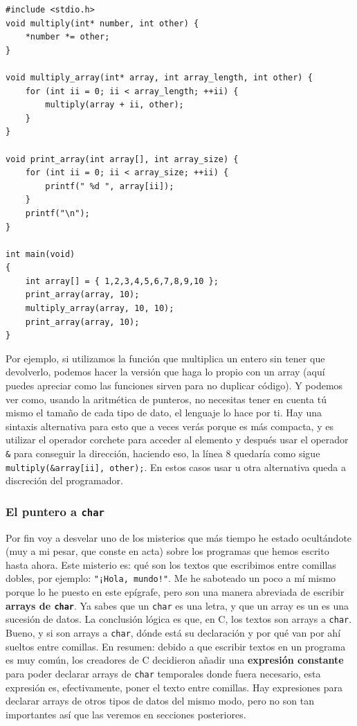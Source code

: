 \documentclass[a4paper]{article}
\begin{document}
\noindent
\begin{minipage}[H]{\linewidth}
\mbox{}
\begin{lstlisting}[style=C, label={lst:pointers4},
caption={Ejemplo práctico de aritmética de punteros}]
#include <stdio.h>
void multiply(int* number, int other) {
    *number *= other;
}

void multiply_array(int* array, int array_length, int other) {
    for (int ii = 0; ii < array_length; ++ii) {
        multiply(array + ii, other);
    }
}

void print_array(int array[], int array_size) {
    for (int ii = 0; ii < array_size; ++ii) {
        printf(" %d ", array[ii]);
    }
    printf("\n");
}

int main(void)
{
    int array[] = { 1,2,3,4,5,6,7,8,9,10 };
    print_array(array, 10);
    multiply_array(array, 10, 10);
    print_array(array, 10);
}
\end{lstlisting}
\end{minipage}


Por ejemplo, si utilizamos la función que multiplica un entero sin tener que
devolverlo, podemos hacer la versión que haga lo propio con un array (aquí
puedes apreciar como las funciones sirven para no duplicar código). Y podemos
ver como, usando la aritmética de punteros, no necesitas tener en cuenta tú
mismo el tamaño de cada tipo de dato, el lenguaje lo hace por ti. Hay una
sintaxis alternativa para esto que a veces verás porque es más compacta, y es
utilizar el operador corchete para acceder al elemento y después usar el
operador \verb!&! para conseguir la dirección, haciendo eso, la línea 8 quedaría
como sigue \lstinline[style=C]{multiply(&array[ii], other);}. En estos casos
usar u otra alternativa queda a discreción del programador.

\subsubsection{El puntero a \texttt{char}}
Por fin voy a desvelar uno de los misterios que más tiempo he estado ocultándote
(muy a mi pesar, que conste en acta) sobre los programas que hemos escrito
hasta ahora. Este misterio es: qué son los textos que escribimos entre comillas
dobles, por ejemplo: \verb|"¡Hola, mundo!"|. Me he saboteado un poco a mí mismo
porque lo he puesto en este epígrafe, pero son una manera abreviada de escribir
\textbf{arrays de \texttt{char}}. Ya sabes que un \verb!char! es una letra, y que
un array es un es una sucesión de datos. La conclusión lógica es que, en C, los
textos son arrays a \verb!char!. Bueno, y si son arrays a \verb!char!, dónde
está su declaración y por qué van por ahí sueltos entre comillas. En resumen:
debido a que escribir textos en un programa es muy común, los creadores de C
decidieron añadir una \textbf{expresión constante} para poder declarar arrays de
\verb!char! temporales donde fuera necesario, esta expresión es, efectivamente,
poner el texto entre comillas. Hay expresiones para declarar arrays de otros
tipos de datos del mismo modo, pero no son tan importantes así que las veremos en
secciones posteriores.
\end{document}
